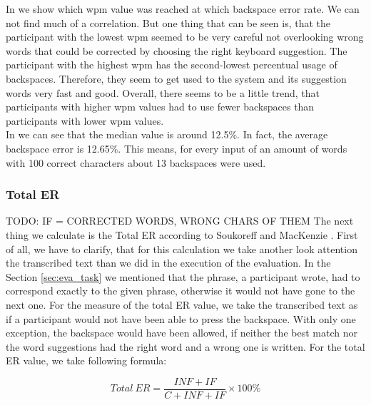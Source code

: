In  we show which wpm value was reached at which backspace error rate. We can not find much of a correlation. But one thing that can be seen is, that the participant with the lowest wpm seemed to be very careful not overlooking wrong words that could be corrected by choosing the right keyboard suggestion. The participant with the highest wpm has the second-lowest percentual usage of backspaces. Therefore, they seem to get used to the system and its suggestion words very fast and good. Overall, there seems to be a little trend, that participants with higher wpm values had to use fewer backspaces than participants with lower wpm values.\\
In  we can see that the median value is around 12.5\%. In fact, the average backspace error is 12.65\%. This means, for every input of an amount of words with 100 correct characters about 13 backspaces were used.\\

\subsubsection{Total ER} TODO: IF = CORRECTED WORDS, WRONG CHARS OF THEM
\label{sec:total_er}
The next thing we calculate is the Total ER according to Soukoreff and MacKenzie \cite{10.1145/642611.642632}. First of all, we have to clarify, that for this calculation we take another look attention the transcribed text than we did in the execution of the evaluation. In the Section \ref{sec:eva_task} we mentioned that the phrase, a participant wrote, had to correspond exactly to the given phrase, otherwise it would not have gone to the next one. For the measure of the total ER value, we take the transcribed text as if a participant would not have been able to press the backspace. With only one exception, the backspace would have been allowed, if neither the best match nor the word suggestions had the right word and a wrong one is written. For the total ER value, we take following formula:

\begin{equation}
    Total\ ER = \frac{INF + IF}{C + INF + IF} \times 100\%
\end{equation}

